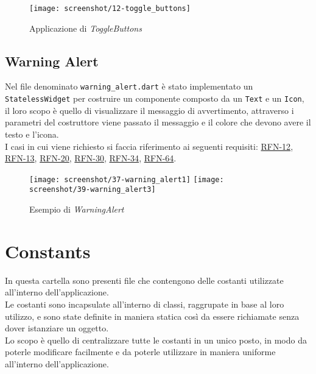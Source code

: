 \begin{figure}[!h] 
    \centering 
    \texttt{[image: screenshot/12-toggle\_buttons]} 
    \caption{Applicazione di \emph{ToggleButtons}}
    \label{fig:toggle-button}
\end{figure}

\clearpage

\subsection{Warning Alert}
\label{subsec:warning-alert}

Nel file denominato \lstinline{warning_alert.dart} è stato implementato un \lstinline{StatelessWidget} per costruire un componente composto da un \lstinline{Text}\cite{site:text} e un \lstinline{Icon}\cite{site:icon}, il loro scopo è quello di visualizzare il messaggio di avvertimento, attraverso i parametri del costruttore viene passato il messaggio e il colore che devono avere il testo e l'icona.\\
I casi in cui viene richiesto si faccia riferimento ai seguenti requisiti: \hyperref[RFN-12]{RFN-12}, \hyperref[RFN-13]{RFN-13}, \hyperref[RFN-20]{RFN-20}, \hyperref[RFN-30]{RFN-30}, \hyperref[RFN-34]{RFN-34}, \hyperref[RFN-64]{RFN-64}.

\begin{figure}[!h] 
    \centering 
    \texttt{[image: screenshot/37-warning\_alert1]}
    \hfill
    \texttt{[image: screenshot/39-warning\_alert3]} 
    \caption{Esempio di \emph{WarningAlert}}
    \label{fig:warning-alert}
\end{figure}

\section{Constants}
\label{sec:constants}

In questa cartella sono presenti file che contengono delle costanti utilizzate all'interno dell'applicazione.\\
Le costanti sono incapsulate all'interno di classi, raggrupate in base al loro utilizzo, e sono state definite in maniera statica così da essere richiamate senza dover istanziare un oggetto.\\
Lo scopo è quello di centralizzare tutte le costanti in un unico posto, in modo da poterle modificare facilmente e da poterle utilizzare in maniera uniforme all'interno dell'applicazione.

